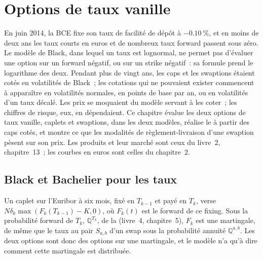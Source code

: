 \chapter{Options de taux vanille}\label{ch:rc:vanilla-rates-options}

En juin 2014, la BCE fixe son taux de facilité de dépôt à $-0.10~\%$, et en moins de deux ans
les taux courts en euros et de nombreux taux forward passent sous zéro. Le modèle de Black, dans
lequel un taux est lognormal, ne permet pas d'évaluer une option sur un forward négatif, ou
sur un strike négatif~: sa formule prend le logarithme des deux. Pendant plus
de vingt ans, les caps et les swaptions étaient cotés en volatilités de Black~; les
cotations qui ne pouvaient exister commencent à apparaître en volatilités normales, en points de base
par an, ou en volatilités d'un taux décalé. Les prix se moquaient du modèle
servant à les coter~; les chiffres de risque, eux, en dépendaient. Ce chapitre évalue
les deux options de taux vanille, caplets et swaptions, dans les deux modèles, réalise le
 à partir des caps cotés, et montre ce que les modalités de
règlement-livraison d'une swaption pèsent sur son prix. Les produits et leur
marché sont ceux du livre~2, chapitre~13~; les courbes en euros sont celles
du chapitre~2.

\section{Black et Bachelier pour les taux}

Un caplet sur l'Euribor à six mois, fixé en $T_{k-1}$ et payé en $T_k$, verse
$N\delta_k\max(F_k(T_{k-1})-K,0)$, où $F_k(t)$ est le forward de ce fixing.
Sous la probabilité forward de $T_k$, $\mathbb Q^{T_k}$, de la  (livre~4,
chapitre~5), $F_k$ est une martingale, de même que le taux au pair
$S_{a,b}$ d'un swap sous la probabilité annuité $\mathbb Q^{a,b}$. Les deux options sont
donc des options sur une martingale, et le modèle n'a qu'à dire comment cette
martingale est distribuée.

